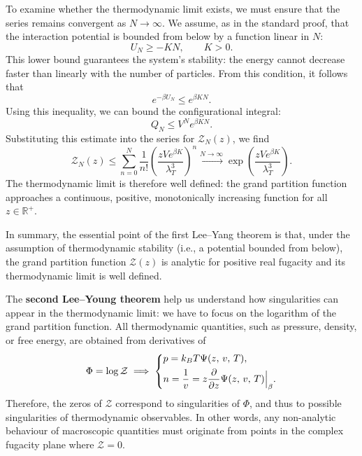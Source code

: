 To examine whether the thermodynamic limit exists, we must ensure that the series
remains convergent as \( N \to \infty \). We assume, as in the standard proof, that
the interaction potential is bounded from below by a function linear in \( N \):
\[
    U_N \ge -K N, \qquad K > 0.
\]
This lower bound guarantees the system’s stability: the energy cannot decrease
faster than linearly with the number of particles. From this condition, it follows that
\[
    e^{-\beta U_N} \le e^{\beta K N}.
\]
Using this inequality, we can bound the configurational integral:
\[
    Q_N \le V^N e^{\beta K N}.
\]
Substituting this estimate into the series for \( \mathcal{Z}_N(z) \), we find
\[
    \mathcal{Z}_N(z)
    \le \sum_{n=0}^N
    \frac{1}{n!}
    \left( \frac{z V e^{\beta K}}{\lambda_{T}^{3}} \right)^n
    \xrightarrow{N\to\infty}
    \exp\!\left( \frac{z V e^{\beta K}}{\lambda_{T}^{3}} \right).
\]
The thermodynamic limit is therefore well defined: the grand partition function
approaches a continuous, positive, monotonically increasing function for all
\( z \in \mathbb{R}^+ \).

In summary, the essential point of the first Lee--Yang theorem is that,
under the assumption of thermodynamic stability (i.e., a potential bounded
from below), the grand partition function \( \mathcal{Z}(z) \) is analytic
for positive real fugacity and its thermodynamic limit is well defined.

The \textbf{second Lee--Young theorem} help us understand how singularities can appear in the thermodynamic limit: we have to focus on the logarithm of the grand partition function. All thermodynamic quantities, such as pressure, density, or free energy, are obtained from derivatives of
\[
    \Phi = \log \mathcal{Z} \implies \begin{dcases}
        p = k_B T \Psi(z,\,v,\,T), \\
        n = \frac{1}{v} = z \frac{\partial}{\partial z} \Psi(z,\,v,\,T) \Big|_{\beta}.
    \end{dcases}
\]
Therefore, the zeros of \( \mathcal{Z} \) correspond to singularities of \( \Phi \), and thus to possible singularities of thermodynamic observables. In other words, any non-analytic behaviour of macroscopic quantities must originate from points in the complex fugacity plane where \( \mathcal{Z} = 0 \).

